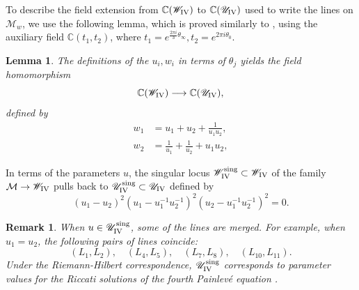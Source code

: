 \documentclass[a4paper,reqno]{amsart}
\numberwithin{equation}{section}
\newcommand{\C}{\mathbb{C}}
\newtheorem{lemma}[theorem]{Lemma}
\newtheorem{remark}[theorem]{Remark}
\numberwithin{equation}{section}
\begin{document}
To describe the field extension from $\C(\mathscr{W}_{\rm{IV}})$ to $\C(\mathscr{U}_{\rm{IV}})$ used to write the lines on $\mathcal{M}_w$, we use the following lemma, which is proved similarly to , using the auxiliary field $\C(t_1,t_2)$, where $t_1=e^{\frac{2\pi i }{3}\theta_\infty},t_2=e^{2\pi i \theta_0}$.
\begin{lemma}     \label{lem:morphismUtoW}
The definitions of the $u_i,w_i$ in terms of $\theta_j$ yields the field homomorphism 
    \begin{equation*}
    \C(\mathscr{W}_{\rm{IV}}) \longrightarrow \C(\mathscr{U}_{\rm{IV}}),
    \end{equation*}
    defined by
\begin{align*}
    w_1&= u_1 + u_2 + \frac{1}{u_1 u_2}, \\
    w_2&= \frac{1}{u_1}+\frac{1}{u_2} +u_1 u_2,
\end{align*}
 \end{lemma}
 
In terms of the parameters $u$, the singular locus $\mathscr{W}_{\rm{IV}}^{\operatorname{sing}}\subset \mathscr{W}_{\rm{IV}}$ of the family $\mathcal{M}\to \mathscr{W}_{\rm{IV}}$ pulls back to $\mathscr{U}_{\rm{IV}}^{\operatorname{sing}}\subset \mathscr{U}_{\rm{IV}}$  defined by 
\begin{equation*}
\left(u_1 - u_2 \right)^2 \left(u_1 - u_1^{-1}u_2^{-1} \right)^2 \left(u_2 - u_1^{-1}u_2^{-1} \right)^2 = 0.
\end{equation*}

\begin{remark}
    When $u\in \mathscr{U}_{\rm{IV}}^{\operatorname{sing}}$, some of the lines are merged. 
For example, when $u_1=u_2$, the following pairs of lines coincide: 
\begin{equation*}
    (L_1,L_2), \quad (L_4,L_5), \quad (L_7,L_{8}),\quad (L_{10},L_{11}).
\end{equation*}
Under the Riemann-Hilbert correspondence, $\mathscr{U}_{\rm{IV}}^{\operatorname{sing}}$ corresponds to parameter values for the Riccati solutions of the fourth Painlev\'e equation \cites{kapaev1996,kapaev1998,saitoterajimanodalcurvesriccati}.

\end{remark}
\end{document}
